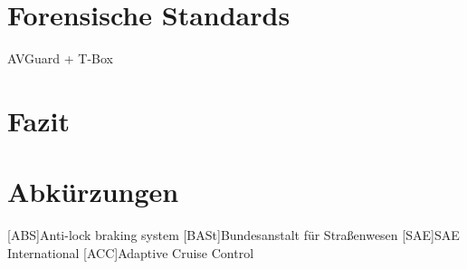 \documentclass[conference,compsoc,final,a4paper]{IEEEtran}
\begin{document}
\section{Forensische Standards}

AVGuard + T-Box

\section{Fazit}
\section*{Abkürzungen}

\begin{acronym}[IEEE]
  [ABS]{Anti-lock braking system}
  [BASt]{Bundesanstalt für Straßenwesen}
  [SAE]{SAE International}
  [ACC]{Adaptive Cruise Control}
\end{acronym}

\printbibliography
\end{document}
